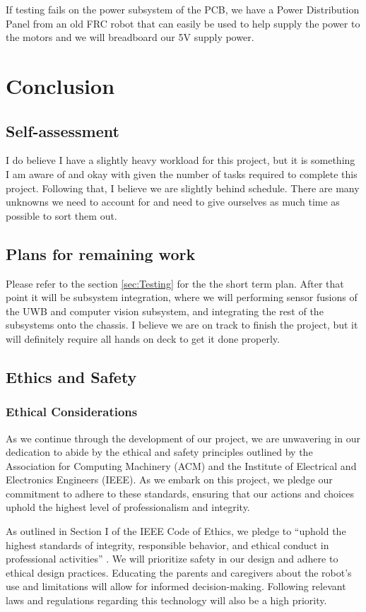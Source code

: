 \documentclass{report}
\begin{document}
    If testing fails on the power subsystem of the PCB, we have a Power Distribution Panel from an old FRC robot that can easily be used to help supply the power to the motors and we will breadboard our 5V supply power.

    \chapter{Conclusion}

    \section{Self-assessment}
    I do believe I have a slightly heavy workload for this project, but it is something I am aware of and okay with given the number of tasks required to complete this project. Following that, I believe we are slightly behind schedule. There are many unknowns we need to account for and need to give ourselves as much time as possible to sort them out.

    \section{Plans for remaining work}
    Please refer to the section \ref{sec:Testing} for the the short term plan. After that point it will be subsystem integration, where we will performing sensor fusions of the UWB and computer vision subsystem, and integrating the rest of the subsystems onto the chassis. I believe we are on track to finish the project, but it will definitely require all hands on deck to get it done properly.

    \section{Ethics and Safety}
    \subsection{Ethical Considerations}
    As we continue through the development of our project, we are unwavering in our dedication to abide by the ethical and safety principles outlined by the Association for Computing Machinery (ACM) and the Institute of Electrical and Electronics Engineers (IEEE). As we embark on this project, we pledge our commitment to adhere to these standards, ensuring that our actions and choices uphold the highest level of professionalism and integrity.

    As outlined in Section I of the IEEE Code of Ethics, we pledge to “uphold the highest standards of integrity, responsible behavior, and ethical conduct in professional activities” \cite{IEEE_2020}. We will prioritize safety in our design and adhere to ethical design practices. Educating the parents and caregivers about the robot’s use and limitations will allow for informed decision-making. Following relevant laws and regulations regarding this technology will also be a high priority.
\end{document}

